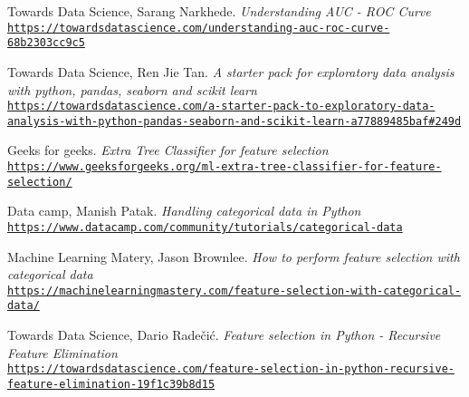 \documentclass[a4paper,12pt]{article}
\begin{document}
\newpage
\begin{thebibliography}{9}

	Towards Data Science, Sarang Narkhede.
	\textit{Understanding AUC - ROC Curve}
	\\\texttt{\url{https://towardsdatascience.com/understanding-auc-roc-curve-68b2303cc9c5}}	
	
	Towards Data Science, Ren Jie Tan. 
	\textit{A starter pack for exploratory data analysis with python, pandas, seaborn and scikit learn}
	\\\texttt{\url{https://towardsdatascience.com/a-starter-pack-to-exploratory-data-analysis-with-python-pandas-seaborn-and-scikit-learn-a77889485baf\#249d}}

	Geeks for geeks. 
	\textit{Extra Tree Classifier for feature selection}
	\\\texttt{\url{https://www.geeksforgeeks.org/ml-extra-tree-classifier-for-feature-selection/}}
	
	Data camp, Manish Patak. 
	\textit{Handling categorical data in Python}
	\\\texttt{\url{https://www.datacamp.com/community/tutorials/categorical-data}}
	
	Machine Learning Matery, Jason Brownlee. 
	\textit{How to perform feature selection with categorical data}
	\\\texttt{\url{https://machinelearningmastery.com/feature-selection-with-categorical-data/}}
	
	Towards Data Science, Dario Radečić. 
	\textit{Feature selection in Python - Recursive Feature Elimination}
	\\\texttt{\url{https://towardsdatascience.com/feature-selection-in-python-recursive-feature-elimination-19f1c39b8d15}}

\end{thebibliography}
\end{document}
